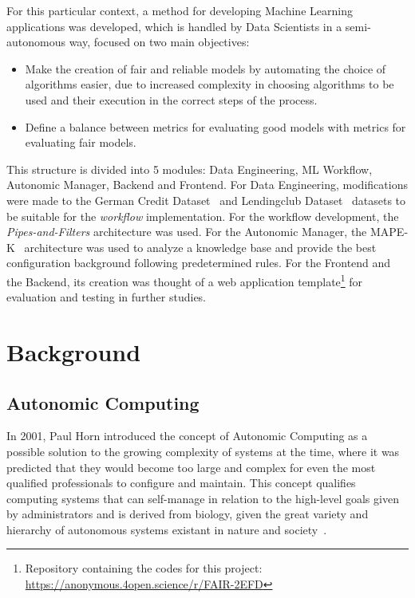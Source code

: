 \documentclass[sigconf]{acmart}
\begin{document}
For this particular context, a method for developing Machine Learning applications was developed, which is handled by Data Scientists in a semi-autonomous way, focused on two main objectives:

\begin{itemize}
\item Make the creation of fair and reliable models by automating the choice of algorithms easier, due to increased complexity in choosing algorithms to be used and their execution in the correct steps of the process.
\item Define a balance between metrics for evaluating good models with metrics for evaluating fair models.
\end{itemize}

This structure is divided into 5 modules: Data Engineering, ML Workflow, Autonomic Manager, Backend and Frontend. For Data Engineering, modifications were made to the German Credit Dataset~\citep{ucigerman_2021} and Lendingclub Dataset~\citep{lendingclub_2022} datasets to be suitable for the \textit{workflow} implementation. For the workflow development, the \textit{Pipes-and-Filters} architecture was used. For the Autonomic Manager, the MAPE-K~\citep{IBM_2005} architecture was used to analyze a knowledge base and provide the best configuration background following predetermined rules. For the Frontend and the Backend, its creation was thought of a web application template\footnote{Repository containing the codes for this project: \url{https://anonymous.4open.science/r/FAIR-2EFD}} for evaluation and testing in further studies.

\section{Background}

\subsection{Autonomic Computing}

In 2001, Paul Horn introduced the concept of Autonomic Computing as a possible solution to the growing complexity of systems at the time, where it was predicted that they would become too large and complex for even the most qualified professionals to configure and maintain. This concept qualifies computing systems that can self-manage in relation to the high-level goals given by administrators and is derived from biology, given the great variety and hierarchy of autonomous systems existant in nature and society~\citep{Kephart_2003}.
\end{document}
